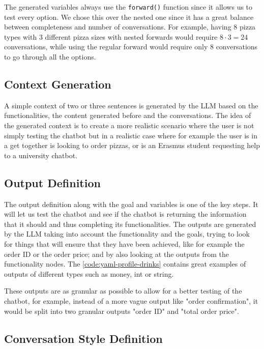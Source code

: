 The generated variables always use the \texttt{forward()} function
since it allows us to test every option.
We chose this over the nested one
since it has a great balance between completeness and number of conversations.
For example, having $8$ pizza types with $3$ different pizza sizes
with nested forwards would require $8 \cdot 3 = 24$ conversations,
while using the regular forward would require only $8$ conversations
to go through all the options.

\subsection{Context Generation}

A simple context of two or three sentences
is generated by the \ac{LLM} based on
the functionalities, the content generated before and the conversations.
The idea of the generated context is to create a more realistic scenario
where the user is not simply testing the chatbot
but in a realistic case where for example
the user is in a get together is looking to order pizzas,
or is an Erasmus student requesting help to a university chatbot.

\subsection{Output Definition}

The output definition along with the goal and variables is one of the key steps.
It will let us test the chatbot
and see if the chatbot is returning the information that it should
and thus completing its functionalities.
The outputs are generated by the \ac{LLM}
taking into account the functionality and the goals,
trying to look for things that will ensure that they have been achieved,
like for example the order ID or the order price;
and by also looking at the outputs from the functionality nodes.
The \autoref{code:yaml-profile-drinks} contains great examples
of outputs of different types such as money, int or string.

These outputs are as granular as possible
to allow for a better testing of the chatbot,
for example, instead of a more vague output like
"order confirmation", it would be split into two granular outputs
"order ID" and "total order price".

\subsection{Conversation Style Definition}

